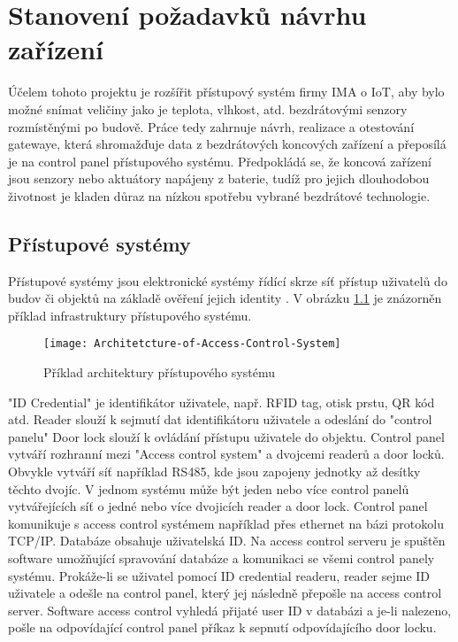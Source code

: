 \chapter{Stanovení požadavků návrhu zařízení}


Účelem tohoto projektu je rozšířit přístupový systém firmy IMA o IoT, aby bylo možné snímat veličiny jako je teplota, vlhkost, atd. bezdrátovými senzory rozmístěnými po budově.
Práce tedy zahrnuje návrh, realizace a otestování gatewaye, která shromažďuje data z bezdrátových koncových zařízení a přeposílá je na control panel přístupového systému. 
Předpokládá se, že koncová zařízení jsou senzory nebo aktuátory napájeny z baterie, tudíž pro jejich dlouhodobou životnost je kladen důraz na nízkou spotřebu vybrané bezdrátové technologie.



\section{Přístupové systémy}
Přístupové systémy jsou elektronické systémy řídící skrze síť přístup uživatelů do budov či objektů na základě ověření jejich identity \cite{accessControlSystem_eiprocus}.
V obrázku \ref{fig:Access control system architecture} je znázorněn příklad infrastruktury přístupového systému.

\begin{figure}[!h]
    \centering
    \texttt{[image: Architetcture-of-Access-Control-System]}
    \caption{Příklad architektury přístupového systému \cite{accessControlSystem_eiprocus}}
    \label{fig:Access control system architecture}
\end{figure}

"ID Credential" je identifikátor uživatele, např. RFID tag, otisk prstu, QR kód atd.
Reader slouží k sejmutí dat identifikátoru uživatele a odeslání do "control panelu"
Door lock slouží k ovládání přístupu uživatele do objektu.
Control panel vytváří rozhranní mezi "Access control system" a dvojcemi readerů a door locků. 
Obvykle vytváří síť například RS485, kde jsou zapojeny jednotky až desítky těchto dvojíc. 
V jednom systému může být jeden nebo více control panelů vytvářejících síť o jedné nebo více dvojicích reader a door lock.
Control panel komunikuje s access control systémem například přes ethernet na bázi protokolu TCP/IP.
Databáze obsahuje uživatelská ID.
Na access control serveru je spuštěn software umožňující spravování databáze a komunikaci se všemi control panely systému.
Prokáže-li se uživatel pomocí ID credential readeru, reader sejme ID uživatele a odešle na control panel, který jej následně přepošle na access control server.
Software access control vyhledá přijaté user ID v databázi a je-li nalezeno, pošle na odpovídající control panel příkaz k sepnutí odpovídajícího door locku.



